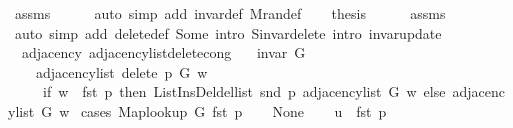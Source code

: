\begin{isabellebody}
\ assms\isanewline
\ \ \ \ \isamarkupfalse%
\ {\isacharparenleft}{\kern0pt}auto\ simp\ add{\isacharcolon}{\kern0pt}\ invar{\isacharunderscore}{\kern0pt}def\ M{\isachardot}{\kern0pt}ran{\isacharunderscore}{\kern0pt}def{\isacharparenright}{\kern0pt}\isanewline
\ \ \isamarkupfalse%
\ {\isacharquery}{\kern0pt}thesis\isanewline
\ \ \ \ \isamarkupfalse%
\ assms\isanewline
\ \ \ \ \isamarkupfalse%
\ {\isacharparenleft}{\kern0pt}auto\ simp\ add{\isacharcolon}{\kern0pt}\ delete{\isacharunderscore}{\kern0pt}def\ Some\ intro{\isacharcolon}{\kern0pt}\ S{\isachardot}{\kern0pt}invar{\isacharunderscore}{\kern0pt}delete\ intro{\isacharcolon}{\kern0pt}\ invar{\isacharunderscore}{\kern0pt}update{\isacharparenright}{\kern0pt}\isanewline
{}\isamarkupfalse%
%
\endisatagproof
{\isafoldproof}%
%
\isadelimproof
\isanewline
%
\endisadelimproof
\isanewline
{}\isamarkupfalse%
\ {\isacharparenleft}{\kern0pt}\ adjacency{\isacharparenright}{\kern0pt}\ adjacency{\isacharunderscore}{\kern0pt}list{\isacharunderscore}{\kern0pt}delete{\isacharunderscore}{\kern0pt}cong{\isacharcolon}{\kern0pt}\isanewline
\ \ \ {\isachardoublequoteopen}invar\ G{\isachardoublequoteclose}\isanewline
\ \ \isanewline
\ \ \ \ {\isachardoublequoteopen}adjacency{\isacharunderscore}{\kern0pt}list\ {\isacharparenleft}{\kern0pt}delete\ p\ G{\isacharparenright}{\kern0pt}\ w\ {\isacharequal}{\kern0pt}\isanewline
\ \ \ \ \ {\isacharparenleft}{\kern0pt}if\ w\ {\isacharequal}{\kern0pt}\ fst\ p\ then\ List{\isacharunderscore}{\kern0pt}Ins{\isacharunderscore}{\kern0pt}Del{\isachardot}{\kern0pt}del{\isacharunderscore}{\kern0pt}list\ {\isacharparenleft}{\kern0pt}snd\ p{\isacharparenright}{\kern0pt}\ {\isacharparenleft}{\kern0pt}adjacency{\isacharunderscore}{\kern0pt}list\ G\ w{\isacharparenright}{\kern0pt}\ else\ adjacency{\isacharunderscore}{\kern0pt}list\ G\ w{\isacharparenright}{\kern0pt}{\isachardoublequoteclose}\isanewline
%
\isadelimproof
%
\endisadelimproof
%
\isatagproof
{}\isamarkupfalse%
\ {\isacharparenleft}{\kern0pt}cases\ {\isachardoublequoteopen}Map{\isacharunderscore}{\kern0pt}lookup\ G\ {\isacharparenleft}{\kern0pt}fst\ p{\isacharparenright}{\kern0pt}{\isachardoublequoteclose}{\isacharparenright}{\kern0pt}\isanewline
\ \ \isamarkupfalse%
\ None\isanewline
\ \ \isamarkupfalse%
\ {\isacharquery}{\kern0pt}u\ {\isacharequal}{\kern0pt}\ {\isachardoublequoteopen}fst\ p{\isachardoublequoteclose}\isanewline
\ \ \isamarkupfalse%

\end{isabellebody}
